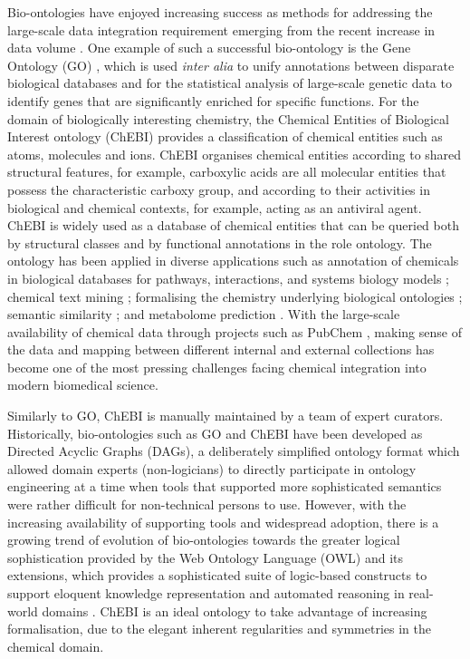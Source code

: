 \documentclass[10pt]{bmc_article}
\newenvironment{bmcformat}{\baselineskip20pt\sloppy\setboolean{publ}{false}}{\baselineskip20pt\sloppy}
\begin{document}
\begin{bmcformat}
Bio-ontologies have enjoyed increasing success as methods for addressing the large-scale data integration requirement emerging from the recent increase in data volume \cite{Harland2011940}. One example of such a successful bio-ontology is the Gene Ontology (GO) \cite{go2000}, which is used \textit{inter alia} to unify annotations between disparate biological databases and for the statistical analysis of large-scale genetic data to identify genes that are significantly enriched for specific functions.  For the domain of biologically interesting chemistry, the Chemical Entities of Biological Interest ontology (ChEBI) \cite{chebi2010} provides a classification of chemical entities such as atoms, molecules and ions.  ChEBI organises chemical entities according to shared structural features, for example, carboxylic acids are all molecular entities that possess the characteristic carboxy group, and according to their activities in biological and chemical contexts, for example, acting as an antiviral agent. ChEBI is widely used as a database of chemical entities that can be queried both by structural classes and by functional annotations in the role ontology. The ontology has been applied in diverse applications such as annotation of chemicals in biological databases for pathways, interactions, and systems biology models \cite{matthews2009,libiomodels2010,kerrien2007}; chemical text mining \cite{corbett2006}; formalising the chemistry underlying biological ontologies \cite{mungall2010}; semantic similarity \cite{couto2010}; and metabolome prediction \cite{swainston2010}. With the large-scale availability of chemical data through projects such as PubChem \cite{bolton2008}, making sense of the data and mapping between different internal and external collections has become one of the most pressing challenges facing chemical integration into modern biomedical science. 

Similarly to GO, ChEBI is manually maintained by a team of expert curators.  Historically, bio-ontologies such as GO and ChEBI have been developed as Directed Acyclic Graphs (DAGs), a deliberately simplified ontology format which allowed domain experts (non-logicians) to directly participate in ontology engineering at a time when tools that supported more sophisticated semantics were rather difficult for non-technical persons to use. However, with the increasing availability of supporting tools and widespread adoption, there is a growing trend of evolution of bio-ontologies towards the greater logical sophistication provided by the Web Ontology Language (OWL) \cite{OWL2NextStep} and its extensions, which provides a sophisticated suite of logic-based constructs to support eloquent knowledge representation and automated reasoning in real-world domains \cite{alterovitz2010}.  ChEBI is an ideal ontology to take advantage of increasing formalisation, due to the elegant inherent regularities and symmetries in the chemical domain.  


\end{bmcformat}
\end{document}
